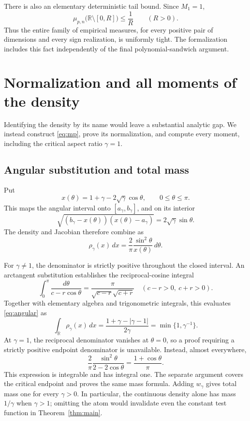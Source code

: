 \documentclass[11pt]{article}
\theoremstyle{remark}
\newcommand{\R}{\mathbb R}
\begin{document}
There is also an elementary deterministic tail bound. Since $M_1=1$,
\begin{equation}\label{eq:tightness}
 \mu_{p,n}\bigl(\R\setminus[0,R]\bigr)\leq\frac1R\qquad(R>0).
\end{equation}
Thus the entire family of empirical measures, for every positive pair of dimensions and every sign realization, is uniformly tight. The formalization includes this fact independently of the final polynomial-sandwich argument.

\section{Normalization and all moments of the density}
Identifying the density by its name would leave a substantial analytic gap. We instead construct \eqref{eq:mp}, prove its normalization, and compute every moment, including the critical aspect ratio $\gamma=1$.

\subsection{Angular substitution and total mass}
Put
\[
 x(\theta)=1+\gamma-2\sqrt\gamma\cos\theta,\qquad 0\leq\theta\leq\pi.
\]
This maps the angular interval onto $[a_\gamma,b_\gamma]$, and on its interior
\[
 \sqrt{(b_\gamma-x(\theta))(x(\theta)-a_\gamma)}
 =2\sqrt\gamma\sin\theta.
\]
The density and Jacobian therefore combine as
\begin{equation}\label{eq:angular}
 \rho_\gamma(x)\,dx=\frac2\pi\frac{\sin^2\theta}{x(\theta)}\,d\theta.
\end{equation}

For $\gamma\ne1$, the denominator is strictly positive throughout the closed interval. An arctangent substitution establishes the reciprocal-cosine integral
\[
 \int_0^\pi\frac{d\theta}{c-r\cos\theta}
 =\frac{\pi}{\sqrt{c-r}\sqrt{c+r}}
 \quad(c-r>0,\ c+r>0).
\]
Together with elementary algebra and trigonometric integrals, this evaluates \eqref{eq:angular} as
\begin{equation}\label{eq:continuous-mass}
 \int_\R\rho_\gamma(x)\,dx
 =\frac{1+\gamma-|\gamma-1|}{2\gamma}
 =\min\{1,\gamma^{-1}\}.
\end{equation}
At $\gamma=1$, the reciprocal denominator vanishes at $\theta=0$, so a proof requiring a strictly positive endpoint denominator is unavailable. Instead, almost everywhere,
\[
 \frac2\pi\frac{\sin^2\theta}{2-2\cos\theta}
 =\frac{1+\cos\theta}{\pi}.
\]
This expression is integrable and has integral one. The separate argument covers the critical endpoint and proves the same mass formula. Adding $w_\gamma$ gives total mass one for every $\gamma>0$. In particular, the continuous density alone has mass $1/\gamma$ when $\gamma>1$; omitting the atom would invalidate even the constant test function in Theorem~\ref{thm:main}.
\end{document}
